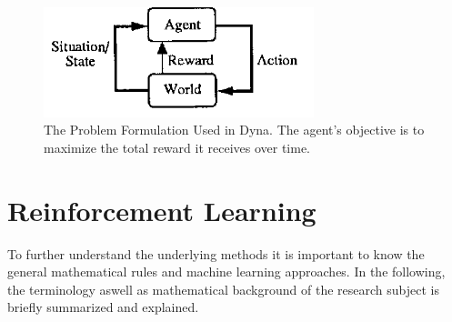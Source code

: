 \documentclass[a4paper]{article}
\begin{document}
	\begin{figure}[h]
		\centering
		\includegraphics[angle=0,width=0.7\textwidth]{./figs/Dyna-Figure1.png}
		\caption{\label{fig:dyna}The Problem Formulation Used in Dyna. The agent's objective is to maximize the total reward it receives over time. \citep{Dyna}}
	\end{figure}
\section{Reinforcement Learning}
To further understand the underlying methods it is important to know the general mathematical rules and machine learning approaches. In the following, the terminology aswell as mathematical background of the research subject is briefly summarized and explained. 
\end{document}
